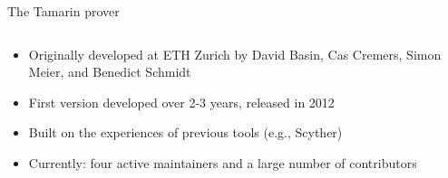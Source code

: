 \documentclass[11pt,aspectratio=169]{beamer}
\begin{document}
\begin{frame}[fragile]{The Tamarin prover}
    \begin{columns}
        \begin{column}{0.6\textwidth}
            \begin{itemize}
                \item Originally developed at ETH Zurich by David Basin, 
                      Cas Cremers, Simon Meier, and Benedict Schmidt
                \item First version developed over 2-3 years, released in 2012
                \item Built on the experiences of previous tools (e.g., Scyther)
                \item Currently: four active maintainers and a large number of 
                      contributors
            \end{itemize}
        \end{column}
\end{columns}
\end{frame}
\end{document}
